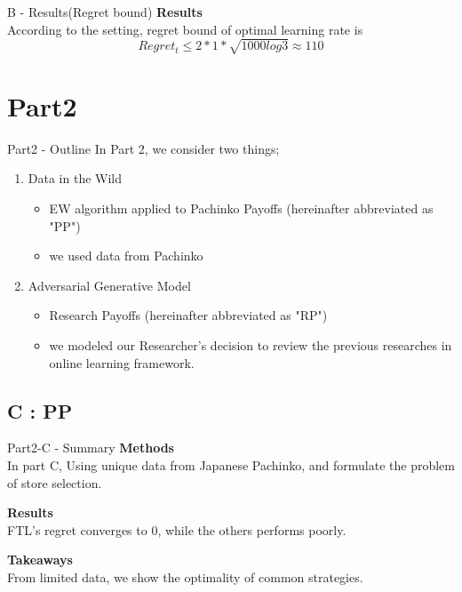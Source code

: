 \documentclass{beamer}
\begin{document}
\begin{frame}{B - Results(Regret bound)}
\textbf{Results}\\
    According to the setting, regret bound of optimal learning rate is
    \[
    Regret_t \leq 2 * 1 * \sqrt{1000log3} \approx 110
    \]
\end{frame}


\section{Part2}


\begin{frame}{Part2 - Outline}
In Part 2, we consider two things;
\begin{enumerate}
    \item Data in the Wild
    \begin{itemize}
        \item EW algorithm applied to Pachinko Payoffs (hereinafter abbreviated as "PP")
        \item we used data from Pachinko
    \end{itemize}
    \item Adversarial Generative Model
    \begin{itemize}
        \item Research Payoffs (hereinafter abbreviated as "RP")
        \item we modeled our Researcher's decision to review the previous researches in online learning framework.
    \end{itemize}
\end{enumerate}
\end{frame}

\subsection{C : PP}

\begin{frame}{Part2-C - Summary}
\textbf{Methods}\\
In part C, Using unique data from Japanese Pachinko, and formulate the problem of store selection.  

\vspace{1em}
\textbf{Results}\\
FTL's regret converges to 0, while the others performs poorly.

\vspace{1em}
\textbf{Takeaways}\\
From limited data, we show the optimality of common strategies.
\end{frame}
\end{document}
